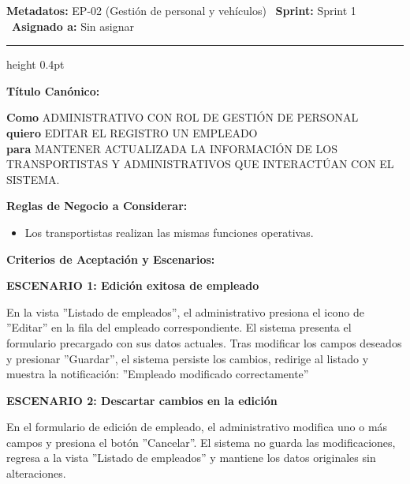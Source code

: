 \documentclass[a4paper,9pt]{article}
\begin{document}
\begin{tcolorbox}[hucard, title={\textbf{HU-43: MODIFICAR PERSONAL} \hfill \scriptsize \colorbox{bluestatus}{\textbf{\ New\ }} \quad \colorbox{white}{\textcolor{primarydark}{\textbf{\ 2 pts\ }}}}]
\vspace{-1pt}
\noindent\textbf{\footnotesize Metadatos:} EP-02 (Gestión de personal y vehículos) \textbar\ \textbf{Sprint:} Sprint 1 \textbar\ \textbf{Asignado a:} Sin asignar\par\vspace{2pt}
\hrule height 0.4pt\par\vspace{3pt}
\noindent\textbf{\footnotesize Título Canónico:}\par\vspace{1pt}
{\small \textbf{Como} ADMINISTRATIVO CON ROL DE GESTIÓN DE PERSONAL \\ \textbf{quiero} EDITAR EL REGISTRO UN EMPLEADO \\ \textbf{para} MANTENER ACTUALIZADA LA INFORMACIÓN DE LOS TRANSPORTISTAS Y ADMINISTRATIVOS QUE INTERACTÚAN CON EL SISTEMA.}\par\vspace{3pt}
\noindent\textbf{\footnotesize Reglas de Negocio a Considerar:}\par\vspace{1pt}
{\footnotesize
\begin{itemize}[leftmargin=12pt, nosep, itemsep=1.5pt, topsep=1pt]
\item Los transportistas realizan las mismas funciones operativas.
\end{itemize}
}\par\vspace{3pt}
\noindent\textbf{\footnotesize Criterios de Aceptación y Escenarios:}\par\vspace{2pt}
{\footnotesize
\noindent\textbf{\textcolor{secondarydark}{ESCENARIO 1:  Edición exitosa de empleado}}\par\vspace{1pt}
En la vista ''Listado de empleados'', el administrativo presiona el icono de ''Editar'' en la fila del empleado correspondiente. El sistema presenta el formulario precargado con sus datos actuales. Tras modificar los campos deseados y presionar ''Guardar'', el sistema persiste los cambios, redirige al listado y muestra la notificación: ''Empleado modificado correctamente''\par\vspace{2.5pt}
\noindent\textbf{\textcolor{secondarydark}{ESCENARIO 2:  Descartar cambios en la edición}}\par\vspace{1pt}
En el formulario de edición de empleado, el administrativo modifica uno o más campos y presiona el botón ''Cancelar''. El sistema no guarda las modificaciones, regresa a la vista ''Listado de empleados'' y mantiene los datos originales sin alteraciones.\par\vspace{2.5pt}
}\par
\end{tcolorbox}
\end{document}
